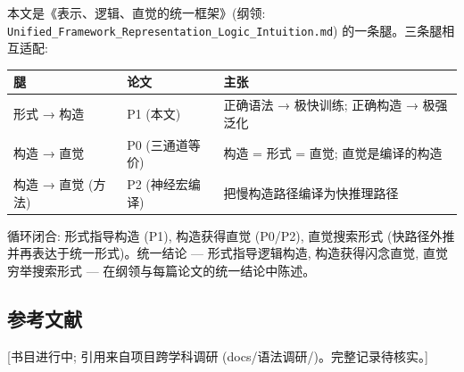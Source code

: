 \documentclass[
]{article}
\begin{document}
本文是《表示、逻辑、直觉的统一框架》(纲领:
\texttt{Unified\_Framework\_Representation\_Logic\_Intuition.md})
的一条腿。三条腿相互适配:

\begin{longtable}[]{@{}lll@{}}
\toprule\noalign{}
腿 & 论文 & 主张 \\
\midrule\noalign{}
\endhead
\bottomrule\noalign{}
\endlastfoot
形式 → 构造 & P1 (本文) & 正确语法 → 极快训练; 正确构造 → 极强泛化 \\
构造 → 直觉 & P0 (三通道等价) & 构造 = 形式 = 直觉; 直觉是编译的构造 \\
构造 → 直觉 (方法) & P2 (神经宏编译) & 把慢构造路径编译为快推理路径 \\
\end{longtable}

循环闭合: 形式指导构造 (P1), 构造获得直觉 (P0/P2), 直觉搜索形式
(快路径外推并再表达于统一形式)。统一结论 --- 形式指导逻辑构造,
构造获得闪念直觉, 直觉穷举搜索形式 ---
在纲领与每篇论文的统一结论中陈述。

\subsection{参考文献}\label{ux53c2ux8003ux6587ux732e}

{[}书目进行中; 引用来自项目跨学科调研
(docs/语法调研/)。完整记录待核实。{]}
\end{document}
